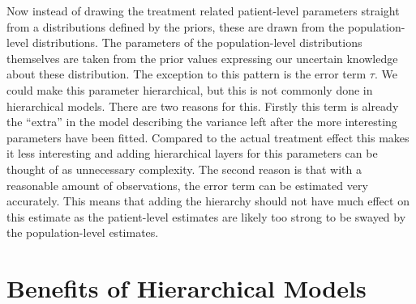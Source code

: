 \documentclass[12pt,a4paper,leqno]{report}
\theoremstyle{plain}
\theoremstyle{definition}
\theoremstyle{remark}
\begin{document}
Now instead of drawing the treatment related patient-level parameters straight from a distributions defined
by the priors, these are drawn from the population-level distributions. The parameters
of the population-level distributions themselves are taken from the prior values expressing our
uncertain knowledge about these distribution. The exception to this pattern is the error
term \(\tau \). We could make this
parameter hierarchical, but this is not commonly done in hierarchical models. There are
two reasons for this. Firstly this term is already the ``extra'' in the model describing
the variance left after the more interesting parameters have been fitted. Compared to the actual
treatment effect this makes it less interesting and adding hierarchical layers for this
parameters can be thought of as unnecessary complexity. The second reason is that with a
reasonable amount of observations, the error term can be estimated very accurately. This
means that adding the hierarchy should not have much effect on this estimate as the
patient-level estimates are likely too strong to be swayed by the population-level
estimates.


\section{Benefits of Hierarchical Models}

\end{document}
